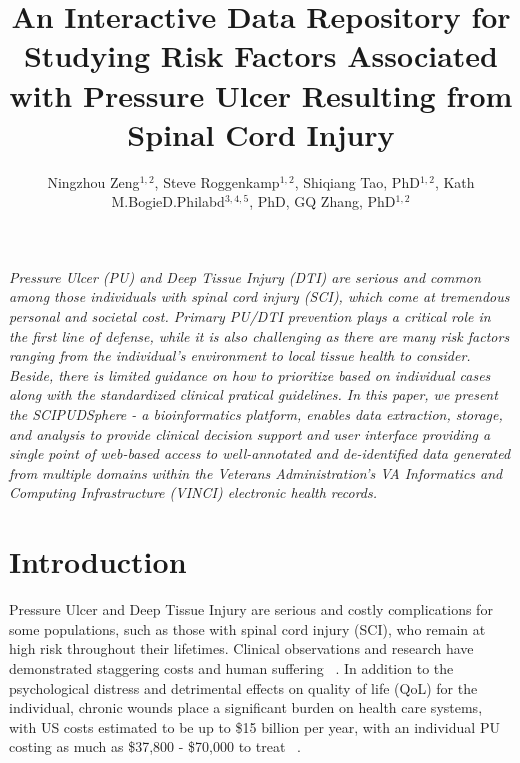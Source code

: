 \documentclass{amia}
\begin{document}
\title{An Interactive Data Repository for Studying Risk Factors Associated with Pressure Ulcer Resulting from Spinal Cord Injury}

\author{Ningzhou Zeng$^{1,2}$, Steve Roggenkamp$^{1,2}$, Shiqiang Tao, PhD$^{1,2}$, Kath M.BogieD.Philabd$^{3,4,5}$, PhD, GQ Zhang, PhD$^{1,2}$}


\maketitle


\textit{Pressure Ulcer (PU) and Deep Tissue Injury (DTI) are serious and common among those individuals with spinal cord injury (SCI), which come at tremendous personal and societal cost. Primary PU/DTI prevention plays a critical role in the first line of defense, while it is also challenging as there are many risk factors ranging from the individual’s environment to local tissue health to consider. Beside, there is limited guidance on how to prioritize based on individual cases along with the standardized clinical pratical guidelines. In this paper, we present the SCIPUDSphere - a bioinformatics platform, enables data extraction, storage, and analysis to provide clinical decision support and user interface providing a single point of web-based access to well-annotated and de-identified data generated from multiple domains within the Veterans Administration's VA Informatics and Computing Infrastructure (VINCI) electronic health records.}

\section{Introduction}
Pressure Ulcer and Deep Tissue Injury are serious and costly complications for some populations, such as those with spinal cord injury (SCI), who remain at high risk throughout their lifetimes. Clinical observations and research have demonstrated staggering costs and human suffering ~\cite{ref1,ref2,ref3}. In addition to the psychological distress and detrimental effects on quality of life (QoL) for the individual, chronic wounds place a significant burden on health care systems, with US costs estimated to be up to \$15 billion per year, with an individual PU costing as much as \$37,800 - \$70,000 to treat  ~\cite{ref4,ref5,ref6}.
\end{document}
